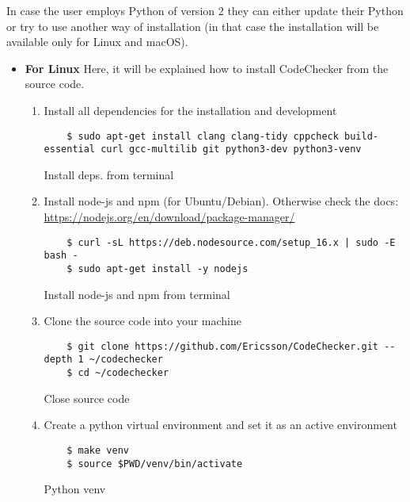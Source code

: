 In case the user employs Python of version 2 they can either update their Python or try to use another way of installation (in that case the installation will be available only for Linux and macOS).

\begin{itemize}
\item \textbf{For Linux}
 Here, it will be explained how to install CodeChecker from the source code. 
 \begin{enumerate}
    \item Install all dependencies for the installation and development
    \begin{listing}[H]
    \begin{verbatim}
    $ sudo apt-get install clang clang-tidy cppcheck build-essential curl gcc-multilib git python3-dev python3-venv
    \end{verbatim}
    \caption{Install deps. from terminal}
    \end{listing}
    
    \item Install node-js and npm (for Ubuntu/Debian). Otherwise check the docs: \url{https://nodejs.org/en/download/package-manager/}
    \begin{listing}[H]
    \begin{verbatim}
    $ curl -sL https://deb.nodesource.com/setup_16.x | sudo -E bash - 
    $ sudo apt-get install -y nodejs
    \end{verbatim}
    \caption{Install node-js and npm from terminal}
    \end{listing}
    
    \item Clone the source code into your machine
    \begin{listing}[H]
    \begin{verbatim}
    $ git clone https://github.com/Ericsson/CodeChecker.git --depth 1 ~/codechecker
    $ cd ~/codechecker
    \end{verbatim}
    \caption{Close source code}
    \end{listing}
    
    \item Create a python virtual environment and set it as an active environment
    \begin{listing}[H]
    \begin{verbatim}
    $ make venv
    $ source $PWD/venv/bin/activate
    \end{verbatim}
    \caption{Python venv}
    \end{listing}
    

\end{enumerate}
\end{itemize}
